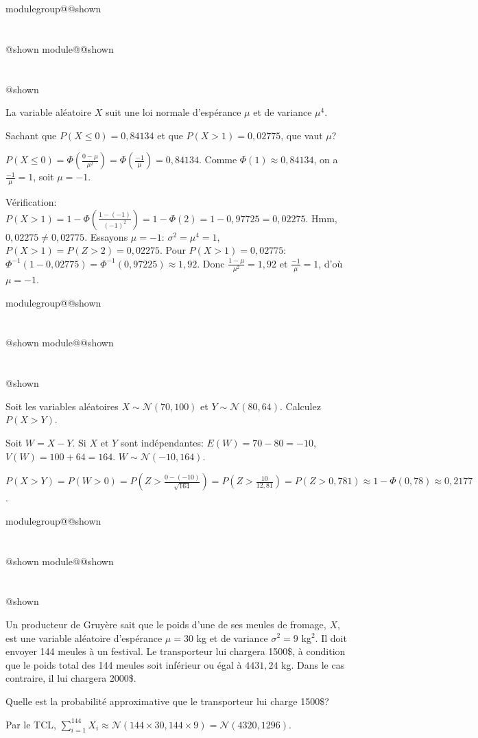 \documentclass{Evaluation}
\makeatletter
\newcommand{\currentmodulekey}{}
\newcommand{\currentmoduletitle}{}
\newcommand{\currentgroupkey}{}
\newcommand{\currentgrouptitle}{}
\newcommand{\showmoduleifneeded}{%
  \ifx\currentgroupkey\empty\else
    \expandafter\ifx\csname modulegroup@\currentgroupkey @shown\endcsname\relax
      \section*{\currentgrouptitle}%
      \expandafter\gdef\csname modulegroup@\currentgroupkey @shown\endcsname{1}%
    \fi
  \fi
  \expandafter\ifx\csname module@\currentmodulekey @shown\endcsname\relax
    \section*{\currentmoduletitle}%
    \expandafter\gdef\csname module@\currentmodulekey @shown\endcsname{1}%
  \fi
}
\newenvironment{A23}{\showmoduleifneeded}{}
\newenvironment{A24}{\showmoduleifneeded}{}
\makeatother
\begin{document}
\begin{questions}
\begin{A23}
\question {} %
La variable aléatoire $X$ suit une loi normale d'espérance $\mu$ et de variance $\mu^4$.

Sachant que $P(X\leq 0)= 0,84134$ et que $P(X> 1)= 0,02775$, que vaut $\mu$?

\begin{solution}
    $P(X\leq 0)=\Phi\left(\frac{0-\mu}{\mu^2}\right)=\Phi\left(\frac{-1}{\mu}\right)=0,84134$. Comme $\Phi(1)\approx 0,84134$, on a $\frac{-1}{\mu}=1$, soit $\mu=-1$.

    Vérification: $P(X>1)=1-\Phi\left(\frac{1-(-1)}{(-1)^2}\right)=1-\Phi(2)=1-0,97725=0,02275$. Hmm, $0,02275\neq 0,02775$. Essayons $\mu=-1$: $\sigma^2=\mu^4=1$, $P(X>1)=P(Z>2)=0,02275$. Pour $P(X>1)=0,02775$: $\Phi^{-1}(1-0,02775)=\Phi^{-1}(0,97225)\approx 1,92$. Donc $\frac{1-\mu}{\mu^2}=1,92$ et $\frac{-1}{\mu}=1$, d'où $\mu=-1$.
\end{solution}
\end{A23}

\begin{A24}
\question {} %
Soit les variables aléatoires $X\sim\mathcal{N}(70, 100)$ et $Y\sim\mathcal{N}(80, 64)$.
Calculez $P(X>Y)$.

\begin{solution}
    Soit $W=X-Y$. Si $X$ et $Y$ sont indépendantes: $E(W)=70-80=-10$, $V(W)=100+64=164$. $W\sim\mathcal{N}(-10,164)$.

    $P(X>Y)=P(W>0)=P\left(Z>\frac{0-(-10)}{\sqrt{164}}\right)=P\left(Z>\frac{10}{12,81}\right)=P(Z>0,781)\approx 1-\Phi(0,78)\approx 0,2177$.
\end{solution}
\end{A24}

\begin{A24}
\question {} %
Un producteur de Gruyère sait que le poids d'une de ses meules de fromage, $X$, est une variable aléatoire d'espérance $\mu=30$ kg et de variance $\sigma^2 = 9$ kg$^2$.
Il doit envoyer 144 meules à un festival.
Le transporteur lui chargera 1500\$, à condition que le poids total des 144 meules soit inférieur ou égal à $4431,24$ kg.
Dans le cas contraire, il lui chargera 2000\$.

Quelle est la probabilité approximative que le transporteur lui charge 1500\$?

\begin{solution}
    Par le TCL, $\sum_{i=1}^{144}X_i \approx \mathcal{N}(144\times 30, 144\times 9)=\mathcal{N}(4320, 1296)$.


\end{solution}
\end{A24}
\end{questions}
\end{document}

